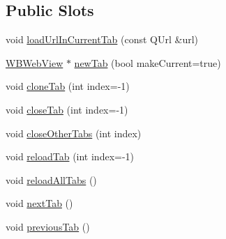 \subsection*{Public Slots}
\begin{DoxyCompactItemize}
\item 
void \hyperlink{class_w_b_tab_widget_ae2b26153a39c7778318287b422111695}{load\-Url\-In\-Current\-Tab} (const Q\-Url \&url)
\item 
\hyperlink{class_w_b_web_view}{W\-B\-Web\-View} $\ast$ \hyperlink{class_w_b_tab_widget_ac4e5333657411084af40f7faa20cac55}{new\-Tab} (bool make\-Current=true)
\item 
void \hyperlink{class_w_b_tab_widget_a8a7d2e9204ab45cadcf80d4c16a3fc4a}{clone\-Tab} (int index=-\/1)
\item 
void \hyperlink{class_w_b_tab_widget_a25d5dcc5eb55ff763325e0a8cfc4889d}{close\-Tab} (int index=-\/1)
\item 
void \hyperlink{class_w_b_tab_widget_a8f18c2fd26be34a4cdff764a84ba1fca}{close\-Other\-Tabs} (int index)
\item 
void \hyperlink{class_w_b_tab_widget_a2692fdd26f27f704243d7236851aa4a9}{reload\-Tab} (int index=-\/1)
\item 
void \hyperlink{class_w_b_tab_widget_a107ae92e25b8d2c697896defa5e47fc1}{reload\-All\-Tabs} ()
\item 
void \hyperlink{class_w_b_tab_widget_a7cefacd9f9251d4cd3de4286bfbfca7a}{next\-Tab} ()
\item 
void \hyperlink{class_w_b_tab_widget_adac63a0e9c9fdb68cce4d93a5904e9a0}{previous\-Tab} ()
\end{DoxyCompactItemize}
